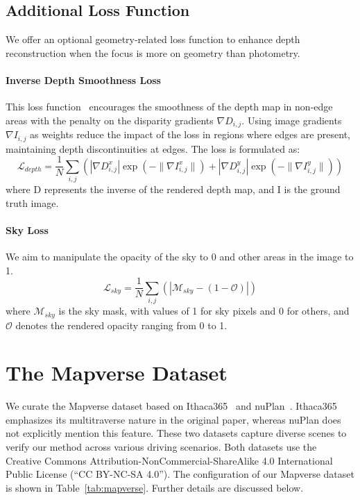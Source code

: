 \subsection{Additional Loss Function} 
\label{subsec:addloss-appendix}
\label{subsec:loss-appendix}
We offer an optional geometry-related loss function to enhance depth reconstruction when the focus is more on geometry than photometry. 

\paragraph{Inverse Depth Smoothness Loss} This loss function~\cite{monodepth17} encourages the smoothness of the depth map in non-edge areas with the penalty on the disparity gradients $\nabla D_{i,j}$. Using image gradients $\nabla I_{i,j}$ as weights reduce the impact of the loss in regions where edges are present, maintaining depth discontinuities at edges. The loss is formulated as:
\begin{equation}
\mathcal{L}_{depth} = \frac{1}{N} \sum_{i,j} \left( |\nabla D_{i,j}^x| \exp \left(- \| \nabla I_{i,j}^x \| \right) + |\nabla D_{i,j}^y| \exp \left(- \| \nabla I_{i,j}^y \| \right) \right) 
\end{equation}
where D represents the inverse of the rendered depth map, and I is the ground truth image.
\paragraph{Sky Loss} We aim to manipulate the opacity of the sky to 0 and other areas in the image to 1.
\begin{equation}
\mathcal{L}_{sky} = \frac{1}{N} \sum_{i,j} \left (|\mathcal{M}_{sky} - (1 - \mathcal{O})|\right)
\end{equation}
where $\mathcal{M}_{sky}$ is the sky mask, with values of 1 for sky pixels and 0 for others, and $\mathcal{O}$ denotes the rendered opacity ranging from 0 to 1.


\clearpage

\section{The Mapverse Dataset}
\label{sec:mapverse}
We curate the Mapverse dataset based on Ithaca365~\cite{diaz2022ithaca365} and nuPlan~\cite{karnchanachari2024towards}. Ithaca365 emphasizes its multitraverse nature in the original paper, whereas nuPlan does not explicitly mention this feature. These two datasets capture diverse scenes to verify our method across various driving scenarios. Both datasets use the Creative Commons Attribution-NonCommercial-ShareAlike 4.0 International Public License (“CC BY-NC-SA 4.0”). The configuration of our Mapverse dataset is shown in Table~\ref{tab:mapverse}. Further details are discussed below.


